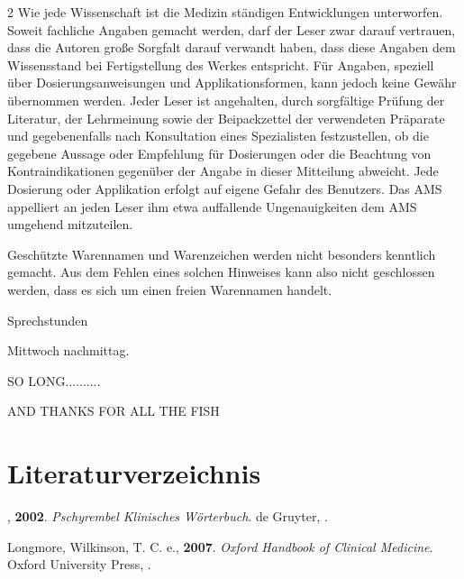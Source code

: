 \documentclass{article}
\begin{document}
\begin{multicols}{2}
Wie jede Wissenschaft ist die Medizin st\"andigen Ent\-wicklungen
unterworfen. Soweit fachliche Angaben ge\-macht werden, darf der Leser
zwar darauf ver\-trau\-en, dass die Autoren gro{\ss}e Sorg\-falt
da\-rauf verwandt haben, dass diese An\-ga\-ben dem Wissens\-stand bei
Ferti\-gstel\-lung des Werkes entspricht. F\"ur Angaben, spe\-ziell
\"uber Dosierungsanweisungen und Ap\-plikations\-formen, kann jedoch
keine Ge\-w\"ahr \"ubernommen werden. Jeder Leser ist angehalten, durch
sorg\-f\"altige Pr\"u\-fung der Literatur, der Lehrmeinung so\-wie der
Beipackzettel der ver\-wendeten Pr\"aparate und gegebenenfalls nach
Konsultation eines Spezialisten fest\-zustellen, ob die gegebene
Aussage oder Empfehlung f\"ur Do\-sierungen oder die Beachtung von
Kon\-tra\-indi\-ka\-tionen gegen\"uber der Angabe in dieser
Mit\-tei\-lung abweicht. Jede Dosierung oder Ap\-pli\-kation erfolgt
auf eigene Gefahr des Be\-nutzers. Das AMS appelliert an jeden Le\-ser
ihm etwa auffallende Un\-ge\-nau\-igkei\-ten dem AMS umgehend
mitzuteilen.

Gesch\"utzte Waren\-namen und Wa\-ren\-zei\-chen werden nicht besonders
kenntlich ge\-macht. Aus dem Fehlen eines solchen Hin\-weises kann also
nicht ge\-schlossen werden, dass es sich um einen freien Waren\-namen
handelt.

\end{multicols}
{\mdseries\color{black}
Sprechstunden}

{\mdseries
Mittwoch nachmittag. }

\printindex
\listoffigures
SO LONG..........

AND THANKS FOR ALL THE FISH

\section[Literaturverzeichnis]{Literaturverzeichnis}
{\mdseries
[1] , \textbf{2002}. \textit{Pschyrembel Klinisches W\"orterbuch}. de
Gruyter, .}

{\mdseries
[2] Longmore, Wilkinson, T. C. e., \textbf{2007}. \textit{Oxford
Handbook of Clinical Medicine}. Oxford University Press, .}
\end{document}
